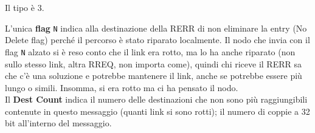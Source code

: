 Il tipo è 3. 

L'unica \textbf{flag} \texttt{N} indica alla destinazione della RERR di non eliminare la entry (No Delete flag) perché il percorso è stato riparato localmente. Il nodo che invia con il flag \texttt{N} alzato si è reso conto che il link era rotto, ma lo ha anche riparato (non sullo stesso link, altra RREQ, non importa come), quindi chi riceve il RERR sa che c'è una soluzione e potrebbe mantenere il link, anche se potrebbe essere più lungo o simili. Insomma, si era rotto ma ci ha pensato il nodo.\\

Il \textbf{Dest Count} indica il numero delle destinazioni che non sono più raggiungibili contenute in questo messaggio (quanti link si sono rotti); il numero di coppie a 32 bit all'interno del messaggio.\\

